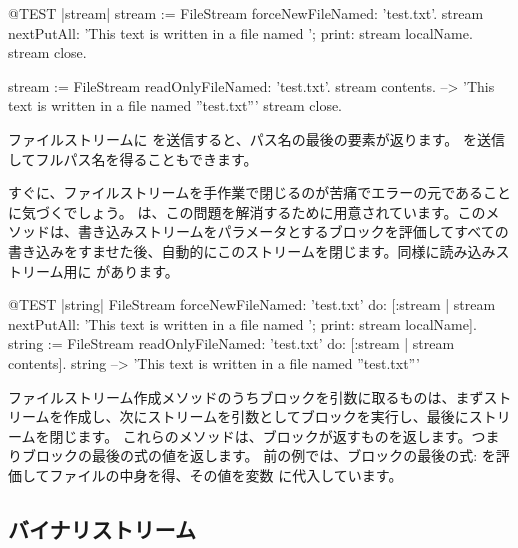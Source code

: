 \documentclass[a4paper,10pt,twoside]{book}
\begin{document}
\begin{code}{@TEST |stream|}
stream := FileStream forceNewFileNamed: 'test.txt'.
stream
    nextPutAll: 'This text is written in a file named ';
    print: stream localName.
stream close.

stream := FileStream readOnlyFileNamed: 'test.txt'.
stream contents. --> 'This text is written in a file named ''test.txt'''
stream close.
\end{code}



ファイルストリームに  を送信すると、パス名の最後の要素が返ります。
 を送信してフルパス名を得ることもできます。

すぐに、ファイルストリームを手作業で閉じるのが苦痛でエラーの元であることに気づくでしょう。
 は、この問題を解消するために用意されています。このメソッドは、書き込みストリームをパラメータとするブロックを評価してすべての書き込みをすませた後、自動的にこのストリームを閉じます。同様に読み込みストリーム用に  があります。%

\begin{code}{@TEST |string|}
FileStream
    forceNewFileNamed: 'test.txt'
    do: [:stream |
        stream
            nextPutAll: 'This text is written in a file named ';
            print: stream localName].
string := FileStream
            readOnlyFileNamed: 'test.txt'
            do: [:stream | stream contents].
string --> 'This text is written in a file named ''test.txt'''
\end{code}

ファイルストリーム作成メソッドのうちブロックを引数に取るものは、まずストリームを作成し、次にストリームを引数としてブロックを実行し、最後にストリームを閉じます。
これらのメソッドは、ブロックが返すものを返します。つまりブロックの最後の式の値を返します。
前の例では、ブロックの最後の式:  を評価してファイルの中身を得、その値を変数  に代入しています。

\subsection{バイナリストリーム}
\end{document}
